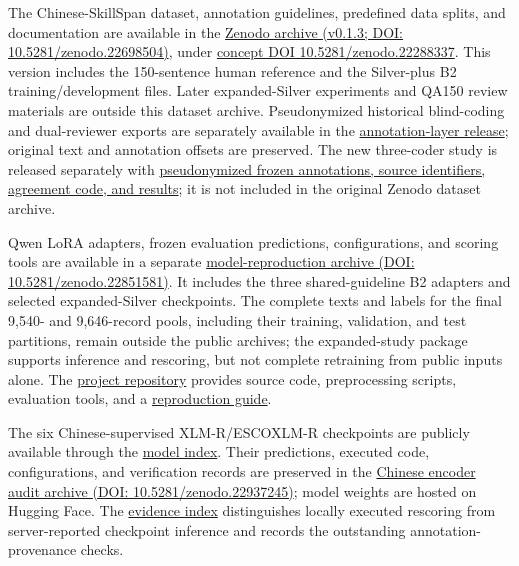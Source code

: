 \documentclass[fleqn,12pt,lineno]{wlpeerj}
\begin{document}
\begin{sloppypar}
\RaggedRight %
The Chinese-SkillSpan dataset, annotation guidelines, predefined data splits, and documentation are available in the \href{https://doi.org/10.5281/zenodo.22698504}{Zenodo archive (v0.1.3; DOI: 10.5281/zenodo.22698504)}, under \href{https://doi.org/10.5281/zenodo.22288337}{concept DOI 10.5281/zenodo.22288337}. This version includes the 150-sentence human reference and the Silver-plus B2 training/development files. Later expanded-Silver experiments and QA150 review materials are outside this dataset archive. Pseudonymized historical blind-coding and dual-reviewer exports are separately available in the \href{https://github.com/AlfredJamesLi/chinese-skillspan-benchmark/blob/main/reproduction/evidence_review_20260925/annotation_layers/README.md}{annotation-layer release}; original text and annotation offsets are preserved. The new three-coder study is released separately with \href{https://github.com/AlfredJamesLi/chinese-skillspan-benchmark/tree/main/reproduction/agreement/finalguide_abc_20261002}{pseudonymized frozen annotations, source identifiers, agreement code, and results}; it is not included in the original Zenodo dataset archive.

Qwen LoRA adapters, frozen evaluation predictions, configurations, and scoring tools are available in a separate \href{https://doi.org/10.5281/zenodo.22851581}{model-reproduction archive (DOI: 10.5281/zenodo.22851581)}. It includes the three shared-guideline B2 adapters and selected expanded-Silver checkpoints. The complete texts and labels for the final 9,540- and 9,646-record pools, including their training, validation, and test partitions, remain outside the public archives; the expanded-study package supports inference and rescoring, but not complete retraining from public inputs alone. The \href{https://github.com/AlfredJamesLi/chinese-skillspan-benchmark}{project repository} provides source code, preprocessing scripts, evaluation tools, and a \href{https://github.com/AlfredJamesLi/chinese-skillspan-benchmark/blob/main/REPRODUCIBILITY.md}{reproduction guide}.

The six Chinese-supervised XLM-R/ESCOXLM-R checkpoints are publicly available through the \href{https://github.com/AlfredJamesLi/chinese-skillspan-benchmark/tree/0c73207c0f9b00fa87f385b78bcb7342bd00bfcb/results_snapshots/table11_evidence_20260924/HF_RELEASE.md}{model index}. Their predictions, executed code, configurations, and verification records are preserved in the \href{https://doi.org/10.5281/zenodo.22937245}{Chinese encoder audit archive (DOI: 10.5281/zenodo.22937245)}; model weights are hosted on Hugging Face. The \href{https://github.com/AlfredJamesLi/chinese-skillspan-benchmark/blob/main/reproduction/evidence_review_20260925/README.md}{evidence index} distinguishes locally executed rescoring from server-reported checkpoint inference and records the outstanding annotation-provenance checks.


\end{sloppypar}
\end{document}
